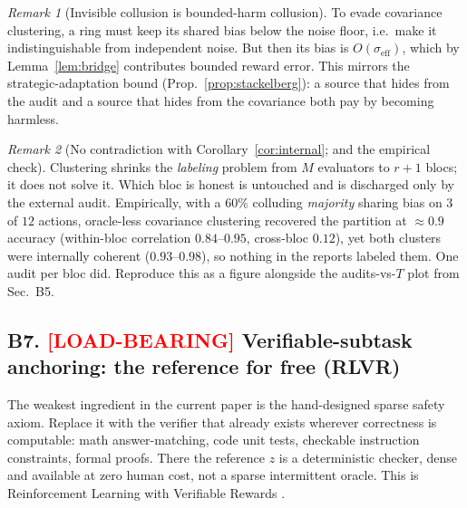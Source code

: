 \documentclass[11pt]{article}
\theoremstyle{definition}
\theoremstyle{remark}
\newtheorem{remark}{Remark}
\begin{document}
\begin{remark}[Invisible collusion is bounded-harm collusion]
To evade covariance clustering, a ring must keep its shared bias below the noise floor, i.e.\ make
it indistinguishable from independent noise. But then its bias is $O(\sigma_{\mathrm{eff}})$, which
by Lemma~\ref{lem:bridge} contributes bounded reward error. This mirrors the strategic-adaptation
bound (Prop.~\ref{prop:stackelberg}): a source that hides from the audit and a source that hides
from the covariance both pay by becoming harmless.
\end{remark}

\begin{remark}[No contradiction with Corollary~\ref{cor:internal}; and the empirical check]
Clustering shrinks the \emph{labeling} problem from $M$ evaluators to $r{+}1$ blocs; it does not
solve it. Which bloc is honest is untouched and is discharged only by the external audit.
Empirically, with a $60\%$ colluding \emph{majority} sharing bias on $3$ of $12$ actions,
oracle-less covariance clustering recovered the partition at $\approx 0.9$ accuracy (within-bloc
correlation $0.84$--$0.95$, cross-bloc $0.12$), yet both clusters were internally coherent
($0.93$--$0.98$), so nothing in the reports labeled them. One audit per bloc did. Reproduce this as
a figure alongside the audits-vs-$T$ plot from Sec.~B5.
\end{remark}

\subsection*{B7. \textcolor{red}{[LOAD-BEARING]} Verifiable-subtask anchoring: the reference for free (RLVR)}

The weakest ingredient in the current paper is the hand-designed sparse safety axiom. Replace it
with the verifier that already exists wherever correctness is computable: math answer-matching, code
unit tests, checkable instruction constraints, formal proofs. There the reference $z$ is a
deterministic checker, dense and available at zero human cost, not a sparse intermittent oracle.
This is Reinforcement Learning with Verifiable Rewards
\citep{lambert2024tulu,guo2025deepseekr1,shao2024deepseekmath,lightman2023verify}.
\end{document}
